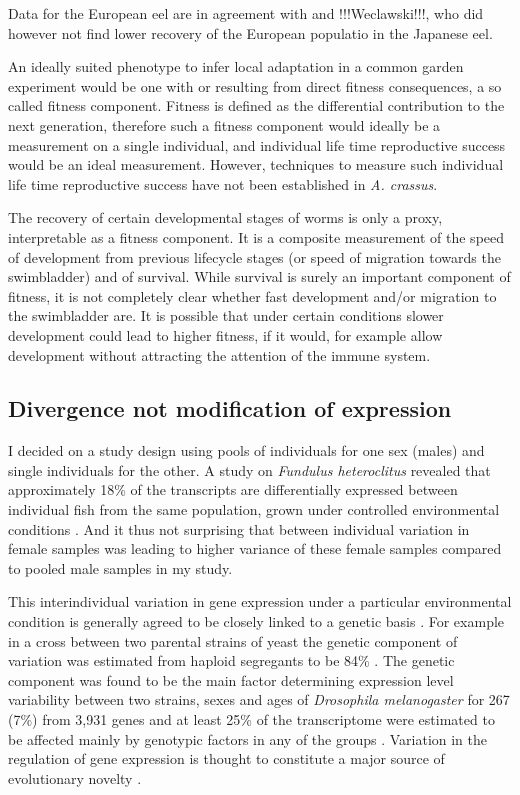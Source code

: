 \documentclass[10pt]{article}
\begin{document}
Data for the European eel are in agreement with
\cite{knopf_differences_2004} and !!!Weclawski!!!, who did however not
find lower recovery of the European populatio in the Japanese eel.

An ideally suited phenotype to infer local adaptation in a common
garden experiment would be one with or resulting from direct fitness
consequences, a so called fitness component. Fitness is defined as the
differential contribution to the next generation, therefore such a
fitness component would ideally be a measurement on a single
individual, and individual life time reproductive success would be an
ideal measurement. However, techniques to measure such individual life
time reproductive success have not been established in
\textit{A. crassus}.

The recovery of certain developmental stages of worms is only a proxy,
interpretable as a fitness component. It is a composite measurement of
the speed of development from previous lifecycle stages (or speed of
migration towards the swimbladder) and of survival. While survival is
surely an important component of fitness, it is not completely clear
whether fast development and/or migration to the swimbladder are. It
is possible that under certain conditions slower development could
lead to higher fitness, if it would, for example allow development
without attracting the attention of the immune system.

\subsection{Divergence not modification of expression}
\label{sec:sample-twelve}

I decided on a study design using pools of individuals for one sex
(males) and single individuals for the other. A study on
\textit{Fundulus heteroclitus} revealed that approximately 18\% of the
transcripts are differentially expressed between individual fish from
the same population, grown under controlled environmental conditions
\cite{pmid12219088}. And it thus not surprising that between
individual variation in female samples was leading to higher variance
of these female samples compared to pooled male samples in my study.

This interindividual variation in gene expression under a particular
environmental condition is generally agreed to be closely linked to a
genetic basis \cite{pmid15498452}. For example in a cross between two
parental strains of yeast the genetic component of variation was
estimated from haploid segregants to be 84\% \cite{pmid11923494}. The
genetic component was found to be the main factor determining
expression level variability between two strains, sexes and ages of
\textit{Drosophila melanogaster} for 267 (7\%) from 3,931 genes and at
least 25\% of the transcriptome were estimated to be affected mainly
by genotypic factors in any of the groups
\cite{pmid11726925}. Variation in the regulation of gene expression is
thought to constitute a major source of evolutionary novelty
\cite{pmid11341673}.
\end{document}
